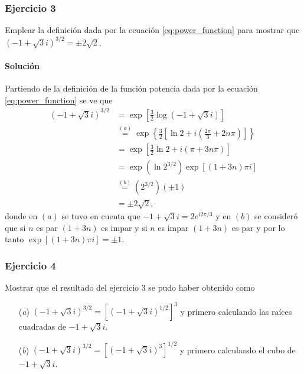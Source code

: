 \documentclass[a4paper]{report}
\begin{document}
\subsubsection{Ejercicio 3}

Emplear la definición dada por la ecuación \ref{eq:power_function} para mostrar que \((-1+\sqrt{3}i)^{3/2}=\pm2\sqrt{2}\).

\paragraph{Solución} Partiendo de la definición de la función potencia dada por la ecuación \ref{eq:power_function} se ve que 
\begin{align*}
 (-1+\sqrt{3}i)^{3/2}&=\exp\left[\frac{3}{2}\log(-1+\sqrt{3}i)\right]\\
  &\overset{(a)}{=}\exp\left\{\frac{3}{2}\left[\ln2+i\left(\frac{2\pi}{3}+2n\pi\right)\right]\right\}\\
  &=\exp\left[\frac{3}{2}\ln2+i\left(\pi+3n\pi\right)\right]\\
  &=\exp\left(\ln2^{3/2}\right)\exp\left[\left(1+3n\right)\pi i\right]\\
  &\overset{(b)}{=}(2^{3/2})(\pm1)\\
  &=\pm2\sqrt{2},
\end{align*}
donde en \((a)\) se tuvo en cuenta que \(-1+\sqrt{3}i=2e^{i2\pi/3}\) y en \((b)\) se consideró que si \(n\) es par \((1+3n)\) es impar y si \(n\) es impar \((1+3n)\) es par y por lo tanto \(\exp[(1+3n)\pi i]=\pm1\).

\subsubsection{Ejercicio 4}

Mostrar que el resultado del ejercicio 3 se pudo haber obtenido como
\begin{enumerate}
 \item[(\textit{a})] \((-1+\sqrt{3}i)^{3/2}=[(-1+\sqrt{3}i)^{1/2}]^3\) y primero calculando las raíces cuadradas de \(-1+\sqrt{3}i\).
 \item[(\textit{b})] \((-1+\sqrt{3}i)^{3/2}=[(-1+\sqrt{3}i)^3]^{1/2}\) y primero calculando el cubo de \(-1+\sqrt{3}i\).
\end{enumerate}
\end{document}

